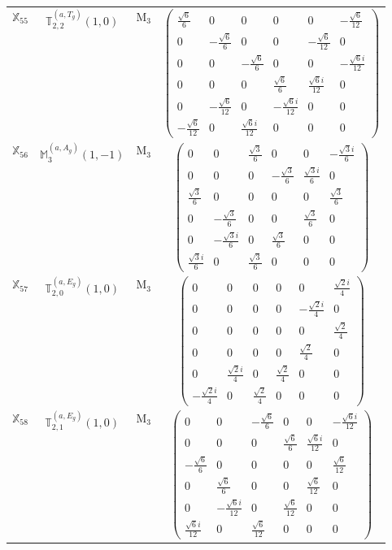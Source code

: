 \documentclass[fleqn,10pt,landscape]{article}
\begin{document}
\begin{itemize}
\begin{center}
\begin{longtable}{c|c|c|c}
$ \mathbb{X}_{55} $ & $\mathbb{T}_{2,2}^{(a,T_{g})}(1,0)$ & M$_{3}$ & $\begin{pmatrix} \frac{\sqrt{6}}{6} & 0 & 0 & 0 & 0 & - \frac{\sqrt{6}}{12} \\ 0 & - \frac{\sqrt{6}}{6} & 0 & 0 & - \frac{\sqrt{6}}{12} & 0 \\ 0 & 0 & - \frac{\sqrt{6}}{6} & 0 & 0 & - \frac{\sqrt{6} i}{12} \\ 0 & 0 & 0 & \frac{\sqrt{6}}{6} & \frac{\sqrt{6} i}{12} & 0 \\ 0 & - \frac{\sqrt{6}}{12} & 0 & - \frac{\sqrt{6} i}{12} & 0 & 0 \\ - \frac{\sqrt{6}}{12} & 0 & \frac{\sqrt{6} i}{12} & 0 & 0 & 0 \end{pmatrix}$ \\
$ \mathbb{X}_{56} $ & $\mathbb{M}_{3}^{(a,A_{g})}(1,-1)$ & M$_{3}$ & $\begin{pmatrix} 0 & 0 & \frac{\sqrt{3}}{6} & 0 & 0 & - \frac{\sqrt{3} i}{6} \\ 0 & 0 & 0 & - \frac{\sqrt{3}}{6} & \frac{\sqrt{3} i}{6} & 0 \\ \frac{\sqrt{3}}{6} & 0 & 0 & 0 & 0 & \frac{\sqrt{3}}{6} \\ 0 & - \frac{\sqrt{3}}{6} & 0 & 0 & \frac{\sqrt{3}}{6} & 0 \\ 0 & - \frac{\sqrt{3} i}{6} & 0 & \frac{\sqrt{3}}{6} & 0 & 0 \\ \frac{\sqrt{3} i}{6} & 0 & \frac{\sqrt{3}}{6} & 0 & 0 & 0 \end{pmatrix}$ \\
$ \mathbb{X}_{57} $ & $\mathbb{T}_{2,0}^{(a,E_{g})}(1,0)$ & M$_{3}$ & $\begin{pmatrix} 0 & 0 & 0 & 0 & 0 & \frac{\sqrt{2} i}{4} \\ 0 & 0 & 0 & 0 & - \frac{\sqrt{2} i}{4} & 0 \\ 0 & 0 & 0 & 0 & 0 & \frac{\sqrt{2}}{4} \\ 0 & 0 & 0 & 0 & \frac{\sqrt{2}}{4} & 0 \\ 0 & \frac{\sqrt{2} i}{4} & 0 & \frac{\sqrt{2}}{4} & 0 & 0 \\ - \frac{\sqrt{2} i}{4} & 0 & \frac{\sqrt{2}}{4} & 0 & 0 & 0 \end{pmatrix}$ \\
$ \mathbb{X}_{58} $ & $\mathbb{T}_{2,1}^{(a,E_{g})}(1,0)$ & M$_{3}$ & $\begin{pmatrix} 0 & 0 & - \frac{\sqrt{6}}{6} & 0 & 0 & - \frac{\sqrt{6} i}{12} \\ 0 & 0 & 0 & \frac{\sqrt{6}}{6} & \frac{\sqrt{6} i}{12} & 0 \\ - \frac{\sqrt{6}}{6} & 0 & 0 & 0 & 0 & \frac{\sqrt{6}}{12} \\ 0 & \frac{\sqrt{6}}{6} & 0 & 0 & \frac{\sqrt{6}}{12} & 0 \\ 0 & - \frac{\sqrt{6} i}{12} & 0 & \frac{\sqrt{6}}{12} & 0 & 0 \\ \frac{\sqrt{6} i}{12} & 0 & \frac{\sqrt{6}}{12} & 0 & 0 & 0 \end{pmatrix}$ \\

\end{longtable}
\end{center}
\end{itemize}
\end{document}
